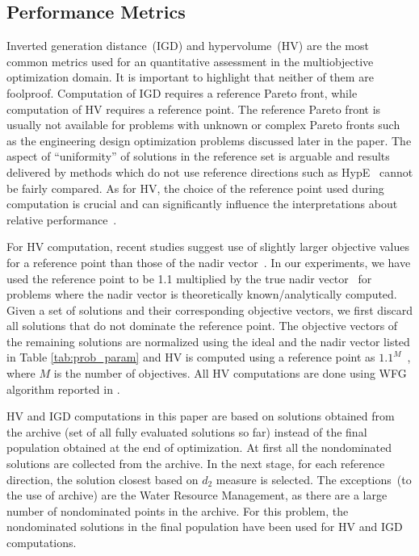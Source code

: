\subsection{Performance Metrics}

Inverted generation distance~(IGD) and hypervolume~(HV) are the most common metrics used for an quantitative assessment in the multiobjective optimization domain. It is important to highlight that neither of them are foolproof. Computation of IGD requires a reference Pareto front, while computation of HV requires a reference point. The reference Pareto front is usually not available for problems with unknown or complex Pareto fronts such as the engineering design optimization problems discussed later in the paper. The aspect of ``uniformity'' of solutions in the reference set is arguable and results delivered by methods which do not use reference directions such as HypE~\cite{bader2011hype} cannot be fairly compared. As for HV, the choice of the reference point used during computation is crucial and can significantly influence the interpretations about relative performance~\cite{auger2009theory,Yuan2016many,ishibuchi2010many}. 

For HV computation, recent studies suggest use of slightly larger objective values for a reference point than those of the nadir vector~\cite{auger2009theory,Yuan2016many,ishibuchi2010many}. In our experiments, we have used the reference point to be 1.1 multiplied by the true nadir vector~\cite{Yuan2016many} for problems where the nadir vector is theoretically known/analytically computed. Given a set of solutions and their corresponding objective vectors, we first discard all solutions that do not dominate the reference point. The objective vectors of the remaining solutions are normalized using the ideal and the nadir vector listed in Table \ref{tab:prob_param} and HV is computed using a reference point as $1.1^M$~\cite{Yuan2016many}, where $M$ is the number of objectives. All HV computations are done using WFG algorithm reported in \cite{while2012hv}. 

HV and IGD computations in this paper are based on solutions obtained from the archive (set of all fully evaluated solutions so far) instead of the final population obtained at the end of optimization. At first all the nondominated solutions are collected from the archive. In the next stage, for each reference direction, the solution closest based on $d_2$ measure is selected. The exceptions~(to the use of archive) are the Water Resource Management, as there are a large number of nondominated points in the archive. For this problem, the nondominated solutions in the final population have been used for HV and IGD computations.  

